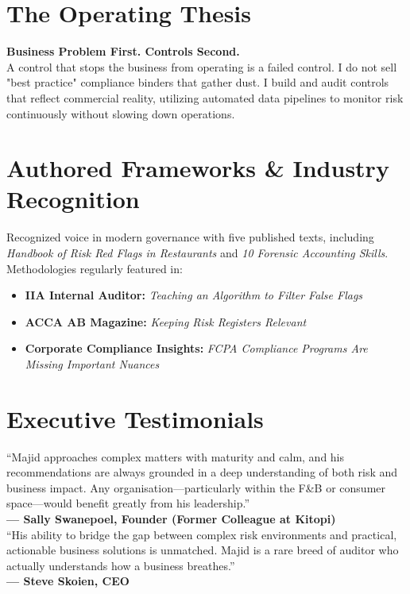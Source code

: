 \documentclass[11pt,a4paper]{article}
\begin{document}
\section*{The Operating Thesis}
\textbf{Business Problem First. Controls Second.} \\
A control that stops the business from operating is a failed control. I do not sell "best practice" compliance binders that gather dust. I build and audit controls that reflect commercial reality, utilizing automated data pipelines to monitor risk continuously without slowing down operations.

\section*{Authored Frameworks \& Industry Recognition}
Recognized voice in modern governance with five published texts, including \textit{Handbook of Risk Red Flags in Restaurants} and \textit{10 Forensic Accounting Skills}. Methodologies regularly featured in:
\begin{itemize}
    \item \textbf{IIA Internal Auditor:} \textit{Teaching an Algorithm to Filter False Flags}
    \item \textbf{ACCA AB Magazine:} \textit{Keeping Risk Registers Relevant}
    \item \textbf{Corporate Compliance Insights:} \textit{FCPA Compliance Programs Are Missing Important Nuances}
\end{itemize}

\section*{Executive Testimonials}
\begin{tcolorbox}[colback=white, colframe=lightGray, arc=4pt, boxrule=0.5pt, left=10pt, right=10pt, top=10pt, bottom=10pt]
``Majid approaches complex matters with maturity and calm, and his recommendations are always grounded in a deep understanding of both risk and business impact. Any organisation—particularly within the F\&B or consumer space—would benefit greatly from his leadership.'' \\
\textbf{— Sally Swanepoel, Founder (Former Colleague at Kitopi)} \\

\vspace{0.2cm}
``His ability to bridge the gap between complex risk environments and practical, actionable business solutions is unmatched. Majid is a rare breed of auditor who actually understands how a business breathes.'' \\
\textbf{— Steve Skoien, CEO}
\end{tcolorbox}
\end{document}
